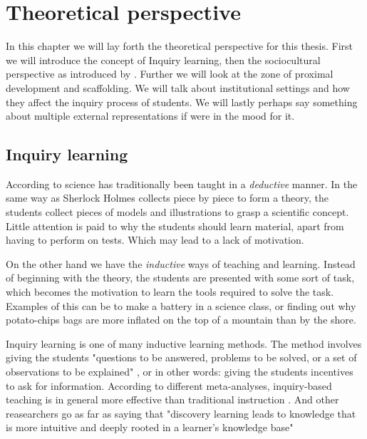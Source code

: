 \chapter{Theoretical perspective}

In this chapter we will lay forth the theoretical perspective for this thesis. First we will introduce the concept of Inquiry learning, then the sociocultural perspective as introduced by \citeauthor*{vygotskiui1978mind}. Further we will look at the zone of proximal development and scaffolding. We will talk about institutional settings and how they affect the inquiry process of students. We will lastly perhaps say something about multiple external representations if were in the mood for it.

\section{Inquiry learning}
According to \citet{prince2006inductive} science has traditionally been taught in a \textit{deductive} manner. In the same way as Sherlock Holmes collects piece by piece to form a theory, the students collect pieces of models and illustrations to grasp a scientific concept. Little attention is paid to why the students should learn material, apart from having to perform on tests. Which may lead to a lack of motivation.

On the other hand we have the \textit{inductive} ways of teaching and learning. Instead of beginning with the theory, the students are presented with some sort of task, which becomes the motivation to learn the tools required to solve the task. Examples of this can be to make a battery in a science class, or finding out why potato-chips bags are more inflated on the top of a mountain than by the shore.

Inquiry learning is one of many inductive learning methods. The method involves giving the students "questions to be answered, problems to be solved, or a set of observations to be explained" \citep{prince2006inductive}, or in other words: giving the students incentives to ask for information. According to different meta-analyses, inquiry-based teaching is in general more effective than traditional instruction \citetext{Smith, 1996; Haury, 1993, referenced in \citealp{prince2006inductive}}. And other reasearchers go as far as saying that "discovery learning leads to knowledge that is more intuitive and deeply rooted in a learner's knowledge base" \citetext{Berry \& Broadbent, 1984; Laurillard, 1992; Lindstrøm, Marton, Ottosson \& Laurillard, 1993; Swaak \& De Jong, 1996, referenced in \citealp{de1998scientific}}

